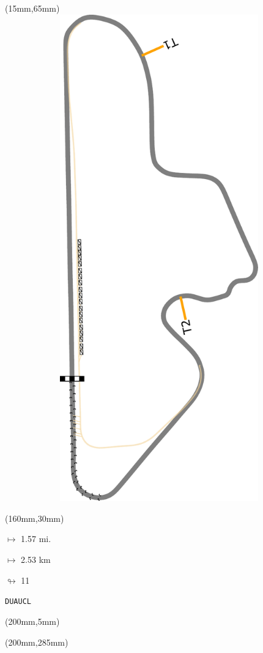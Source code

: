 \begin{textblock*}{185mm}(15mm,65mm)%
\centering
\mbox{\includegraphics[width=185mm,height=210mm,keepaspectratio]{PT/DUAUCL.pdf}}
\end{textblock*}
\begin{textblock*}{40mm}(160mm,30mm)%
\Large
\par$\mapsto$ 1.57 mi.
\par$\mapsto$ 2.53 km
\par$\looparrowright$ 11
\par\hfill\tiny\tt DUAUCL\\
\end{textblock*}
\begin{textblock*}{20mm}(200mm,5mm)%
\fbox{\thepage}
\label{DUAUCL}
\end{textblock*}
\begin{textblock*}{20mm}(200mm,285mm)%
\fbox{\thepage}
\end{textblock*}

